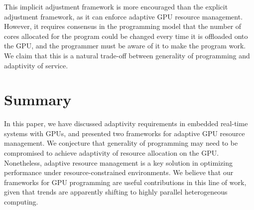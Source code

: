 \documentclass[times, 10pt, twocolumn]{article}
\begin{document}
This implicit adjustment framework is more encouraged than the explicit
adjustment framework, as it can enforce adaptive GPU resource
management.
However, it requires consensus in the programming model that the number
of cores allocated for the program could be changed every time it is
offloaded onto the GPU, and the programmer must be aware of it to make
the program work.
We claim that this is a natural trade-off between generality of
programming and adaptivity of service.

\section{Summary}
\label{sec:summary}

In this paper, we have discussed adaptivity requirements in embedded
real-time systems with GPUs, and presented two frameworks for adaptive
GPU resource management.
We conjecture that generality of programming may need to be compromised
to achieve adaptivity of resource allocation on the GPU.
Nonetheless, adaptive resource management is a key solution in
optimizing performance under resource-constrained environments.
We believe that our frameworks for GPU programming are useful
contributions in this line of work, given that trends are apparently
shifting to highly parallel heterogeneous computing.


{\footnotesize

}
\end{document}
